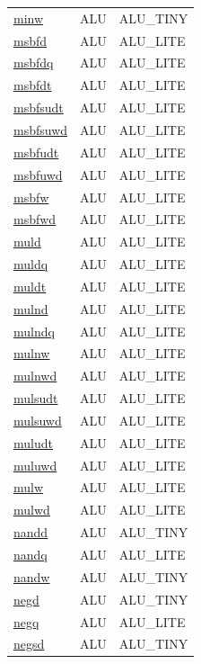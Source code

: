 \begin{small}
\begin{longtable}[l]{l l l}
\hyperlink{lvx.minw}{minw} & ALU & ALU\_TINY \\ 
\hyperlink{lvx.msbfd}{msbfd} & ALU & ALU\_LITE \\ 
\hyperlink{lvx.msbfdq}{msbfdq} & ALU & ALU\_LITE \\ 
\hyperlink{lvx.msbfdt}{msbfdt} & ALU & ALU\_LITE \\ 
\hyperlink{lvx.msbfsudt}{msbfsudt} & ALU & ALU\_LITE \\ 
\hyperlink{lvx.msbfsuwd}{msbfsuwd} & ALU & ALU\_LITE \\ 
\hyperlink{lvx.msbfudt}{msbfudt} & ALU & ALU\_LITE \\ 
\hyperlink{lvx.msbfuwd}{msbfuwd} & ALU & ALU\_LITE \\ 
\hyperlink{lvx.msbfw}{msbfw} & ALU & ALU\_LITE \\ 
\hyperlink{lvx.msbfwd}{msbfwd} & ALU & ALU\_LITE \\ 
\hyperlink{lvx.muld}{muld} & ALU & ALU\_LITE \\ 
\hyperlink{lvx.muldq}{muldq} & ALU & ALU\_LITE \\ 
\hyperlink{lvx.muldt}{muldt} & ALU & ALU\_LITE \\ 
\hyperlink{lvx.mulnd}{mulnd} & ALU & ALU\_LITE \\ 
\hyperlink{lvx.mulndq}{mulndq} & ALU & ALU\_LITE \\ 
\hyperlink{lvx.mulnw}{mulnw} & ALU & ALU\_LITE \\ 
\hyperlink{lvx.mulnwd}{mulnwd} & ALU & ALU\_LITE \\ 
\hyperlink{lvx.mulsudt}{mulsudt} & ALU & ALU\_LITE \\ 
\hyperlink{lvx.mulsuwd}{mulsuwd} & ALU & ALU\_LITE \\ 
\hyperlink{lvx.muludt}{muludt} & ALU & ALU\_LITE \\ 
\hyperlink{lvx.muluwd}{muluwd} & ALU & ALU\_LITE \\ 
\hyperlink{lvx.mulw}{mulw} & ALU & ALU\_LITE \\ 
\hyperlink{lvx.mulwd}{mulwd} & ALU & ALU\_LITE \\ 
\hyperlink{lvx.nandd}{nandd} & ALU & ALU\_TINY \\ 
\hyperlink{lvx.nandq}{nandq} & ALU & ALU\_LITE \\ 
\hyperlink{lvx.nandw}{nandw} & ALU & ALU\_TINY \\ 
\hyperlink{lvx.negd}{negd} & ALU & ALU\_TINY \\ 
\hyperlink{lvx.negq}{negq} & ALU & ALU\_LITE \\ 
\hyperlink{lvx.negsd}{negsd} & ALU & ALU\_TINY \\ 

\end{longtable}
\end{small}
